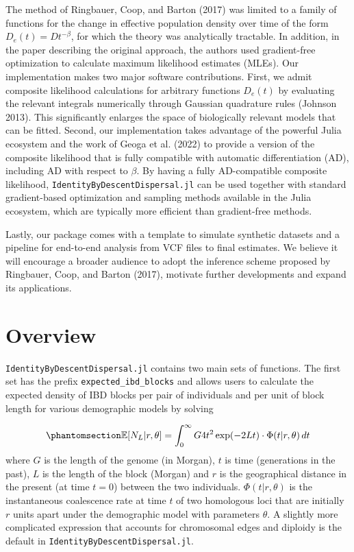 \documentclass[
]{article}
\begin{document}
The method of Ringbauer, Coop, and Barton (2017) was limited to a family
of functions for the change in effective population density over time of
the form \(D_e(t) = Dt^{-\beta}\), for which the theory was analytically
tractable. In addition, in the paper describing the original approach,
the authors used gradient-free optimization to calculate maximum
likelihood estimates (MLEs). Our implementation makes two major software
contributions. First, we admit composite likelihood calculations for
arbitrary functions \(D_e(t)\) by evaluating the relevant integrals
numerically through Gaussian quadrature rules (Johnson 2013). This
significantly enlarges the space of biologically relevant models that
can be fitted. Second, our implementation takes advantage of the
powerful Julia ecosystem and the work of Geoga et al. (2022) to provide
a version of the composite likelihood that is fully compatible with
automatic differentiation (AD), including AD with respect to \(\beta\).
By having a fully AD-compatible composite likelihood,
\texttt{IdentityByDescentDispersal.jl} can be used together with
standard gradient-based optimization and sampling methods available in
the Julia ecosystem, which are typically more efficient than
gradient-free methods.

Lastly, our package comes with a template to simulate synthetic datasets
and a pipeline for end-to-end analysis from VCF files to final
estimates. We believe it will encourage a broader audience to adopt the
inference scheme proposed by Ringbauer, Coop, and Barton (2017),
motivate further developments and expand its applications.

\section{Overview}\label{sec-overview}

\texttt{IdentityByDescentDispersal.jl} contains two main sets of
functions. The first set has the prefix \texttt{expected\_ibd\_blocks}
and allows users to calculate the expected density of IBD blocks per
pair of individuals and per unit of block length for various demographic
models by solving

\begin{equation}\phantomsection\label{eq-1}{
\mathbb{E}[N_L | r, \theta] = \int_0^\infty G4t^2 \exp(-2Lt) \cdot \Phi(t | r, \theta) \,dt
}\end{equation} where \(G\) is the length of the genome (in Morgan),
\(t\) is time (generations in the past), \(L\) is the length of the
block (Morgan) and \(r\) is the geographical distance in the present (at
time \(t=0\)) between the two individuals. \(\Phi(t| r, \theta)\) is the
instantaneous coalescence rate at time \(t\) of two homologous loci that
are initially \(r\) units apart under the demographic model with
parameters \(\theta\). A slightly more complicated expression that
accounts for chromosomal edges and diploidy is the default in
\texttt{IdentityByDescentDispersal.jl}.
\end{document}
